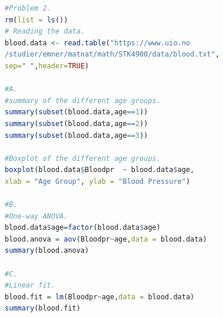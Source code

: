 \documentclass[a4paper,12pt]{article}
\begin{document}
\begin{lstlisting}[language=R]
#Problem 2.
rm(list = ls())
# Reading the data.
blood.data <- read.table("https://www.uio.no
/studier/emner/matnat/math/STK4900/data/blood.txt",
sep=" ",header=TRUE)

#A.
#summary of the different age groups.
summary(subset(blood.data,age==1))
summary(subset(blood.data,age==2))
summary(subset(blood.data,age==3))

#Boxplot of the different age groups.
boxplot(blood.data$Bloodpr  ~ blood.data$age, 
xlab = "Age Group", ylab = "Blood Pressure")

#B.
#One-way ANOVA.
blood.data$age=factor(blood.data$age)
blood.anova = aov(Bloodpr~age,data = blood.data)
summary(blood.anova)

#C.
#Linear fit.
blood.fit = lm(Bloodpr~age,data = blood.data)
summary(blood.fit)
\end{lstlisting}
\end{document}
